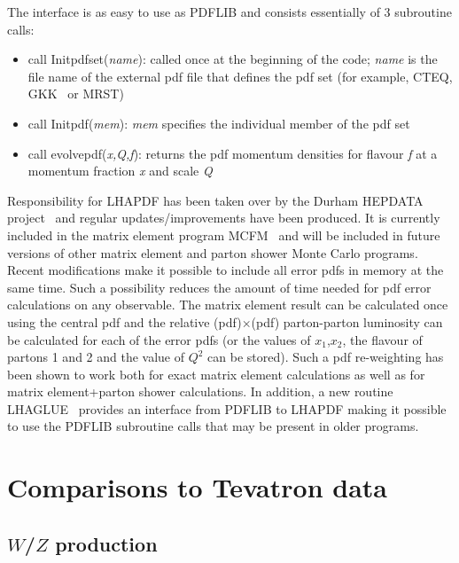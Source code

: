 \documentclass[12pt]{iopart}
\begin{document}
The interface is as easy to use as PDFLIB and consists essentially of 3 subroutine calls:
\begin{itemize}
\item	call Initpdfset({\it name}): called once at the beginning of the code; {\it name} is the file name of the
 external pdf file that defines the pdf set (for example, CTEQ, GKK~\cite{Giele:2001mr} or MRST)
\item	call Initpdf({\it mem}): {\it mem} specifies the individual member of the pdf set
\item	call evolvepdf({\it x,Q,f}): returns the pdf momentum densities for flavour {\it f} at a momentum fraction {\it x}
and scale {\it Q}
\end{itemize}


Responsibility for LHAPDF has been taken over by the Durham HEPDATA project~\cite{Whalley:2005nh} and regular updates/improvements have been
produced.  It is currently included in the matrix element program MCFM~\cite{Campbell:2000bg} and will be included in future
versions of other matrix element and parton shower Monte Carlo programs. Recent modifications make it possible to include all
error pdfs in memory at the same time. Such a possibility reduces the amount of time needed for pdf error calculations on any
observable. The matrix element result can be calculated once using the central pdf and the relative (pdf)$\times$(pdf) parton-parton
luminosity can be calculated for each of the error pdfs (or the values of $x_1$,$x_2$, the flavour of partons 1 and 2 and the
value of $Q^2$ can be stored). Such a pdf re-weighting has been shown to work both for exact matrix element calculations as well
as for matrix element+parton shower calculations. In addition, a new routine LHAGLUE~\cite{Whalley:2005nh} provides an interface
from PDFLIB to LHAPDF making it possible to use the PDFLIB subroutine calls that may be present in older programs. 
	

\section{Comparisons to Tevatron data}
\label{sec:tevatron}

\subsection{$W$/$Z$ production}
\label{sec:tevwz}
\end{document}
